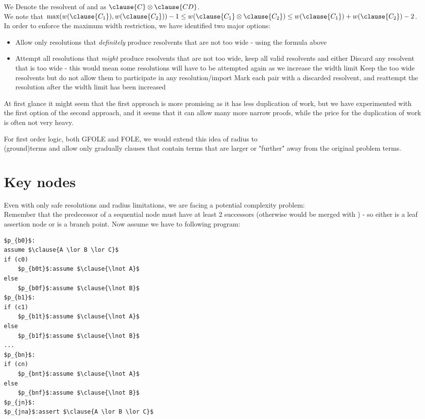\noindent
We Denote the resolvent of  and  as $\clause{C} \otimes \clause{CD}$. \\
We note that $\textrm{max}(w(\clause{C_1}),w(\clause{C_2}))-1 \leq w(\clause{C_1} \otimes \clause{C_2}) \leq w(\clause{C_1})+w(\clause{C_2})-2$.\\
In order to enforce the maximum width restriction, we have identified two major options:
\begin{itemize}
	\item Allow only resolutions that \emph{definitely} produce resolvents that are not too wide - using the formula above
	\item Attempt all resolutions that \emph{might} produce resolvents that are not too wide, keep all valid resolvents and either
		\subitem Discard any resolvent that is too wide - this would mean some resolutions will have to be attempted again as we increase the width limit
		\subitem Keep the too wide resolvents but do not allow them to participate in any resolution/import
		\subitem Mark each pair with a discarded resolvent, and reattempt the resolution after the width limit has been increased
\end{itemize}

At first glance it might seem that the first approach is more promising as it has less duplication of work, but we have experimented with the first option of the second approach, and it seems that it can allow many more narrow proofs, while the price for the duplication of work is often not very heavy.

For first order logic, both GFOLE and FOLE, we would extend this idea of radius to \\
(ground)terms and allow only gradually clauses that contain terms that are larger or "further" away from the original problem terms.

\section{Key nodes}
Even with only safe resolutions and radius limitations, we are facing a potential complexity problem:\\
Remember that the predecessor  of a sequential node  must have at least 2 successors (otherwise  would be merged with ) - so either  is a leaf assertion node or  is a branch point.
Now assume we have to following program:
\begin{lstlisting}[mathescape]
$p_{b0}$: 
assume $\clause{A \lor B \lor C}$
if (c0)
	$p_{b0t}$:assume $\clause{\lnot A}$
else
	$p_{b0f}$:assume $\clause{\lnot B}$
$p_{b1}$: 
if (c1)
	$p_{b1t}$:assume $\clause{\lnot A}$
else
	$p_{b1f}$:assume $\clause{\lnot B}$
...
$p_{bn}$: 
if (cn)
	$p_{bnt}$:assume $\clause{\lnot A}$
else
	$p_{bnf}$:assume $\clause{\lnot B}$
$p_{jn}$: 
$p_{jna}$:assert $\clause{A \lor B \lor C}$ 
\end{lstlisting}

